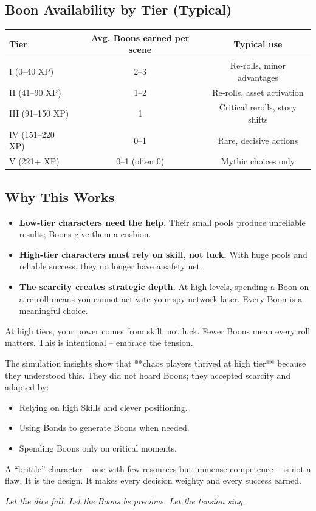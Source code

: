 \subsection*{Boon Availability by Tier (Typical)}

\begin{center}
\begin{tabular}{lcc}
\toprule
\textbf{Tier} & \textbf{Avg. Boons earned per scene} & \textbf{Typical use} \\
\midrule
I (0–40 XP) & 2–3 & Re‑rolls, minor advantages \\
II (41–90 XP) & 1–2 & Re‑rolls, asset activation \\
III (91–150 XP) & 1 & Critical rerolls, story shifts \\
IV (151–220 XP) & 0–1 & Rare, decisive actions \\
V (221+ XP) & 0–1 (often 0) & Mythic choices only \\
\bottomrule
\end{tabular}
\end{center}

\subsection*{Why This Works}
\begin{itemize}
  \item \textbf{Low‑tier characters need the help.} Their small pools produce unreliable results; Boons give them a cushion.
  \item \textbf{High‑tier characters must rely on skill, not luck.} With huge pools and reliable success, they no longer have a safety net.
  \item \textbf{The scarcity creates strategic depth.} At high levels, spending a Boon on a re‑roll means you cannot activate your spy network later. Every Boon is a meaningful choice.
\end{itemize}

\begin{tcolorbox}[colback=blue!5!white, colframe=blue!75!black, title=Why Brittleness is Good]
At high tiers, your power comes from skill, not luck. Fewer Boons mean every roll matters. This is intentional – embrace the tension.

\medskip
\noindent The simulation insights show that **chaos players thrived at high tier** because they understood this. They did not hoard Boons; they accepted scarcity and adapted by:
\begin{itemize}
  \item Relying on high Skills and clever positioning.
  \item Using Bonds to generate Boons when needed.
  \item Spending Boons only on critical moments.
\end{itemize}
A “brittle” character – one with few resources but immense competence – is not a flaw. It is the design. It makes every decision weighty and every success earned.

\medskip
\noindent \textit{Let the dice fall. Let the Boons be precious. Let the tension sing.}
\end{tcolorbox}

